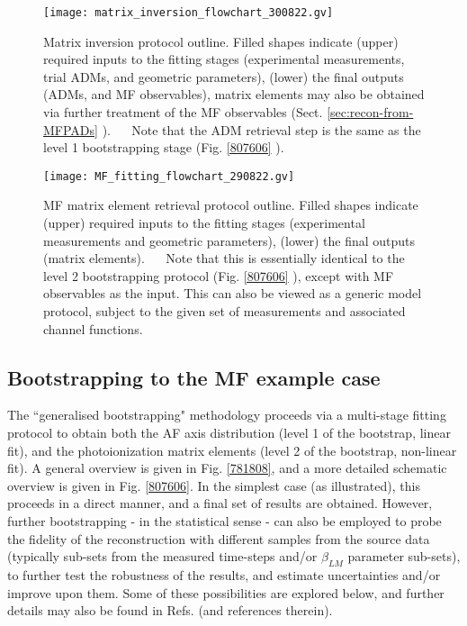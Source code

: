 \documentclass[10pt]{article}
\begin{document}
\begin{figure}[]
\begin{center}
\texttt{[image: matrix\_inversion\_flowchart\_300822.gv]}
\caption{Matrix inversion protocol outline. Filled shapes indicate (upper) required inputs to the fitting stages (experimental measurements, trial ADMs, and geometric parameters), (lower) the final outputs (ADMs, and MF observables), matrix elements may also be obtained via further treatment of the MF observables (Sect. \ref{sec:recon-from-MFPADs} ).    Note that the ADM retrieval step is the same as the level 1 bootstrapping stage (Fig. \ref{807606} ).\label{731792}}
\end{center}
\end{figure}


\begin{figure}[]
\begin{center}
\texttt{[image: MF\_fitting\_flowchart\_290822.gv]}
\caption{MF matrix element retrieval protocol outline. Filled shapes indicate (upper) required inputs to the fitting stages (experimental measurements and geometric parameters), (lower) the final outputs (matrix elements).    Note that this is essentially identical to the level 2 bootstrapping protocol (Fig. \ref{807606} ), except with MF observables as the input. This can also be viewed as a generic model protocol, subject to the given set of measurements and associated channel functions.\label{671760}}
\end{center}
\end{figure}

\subsection{Bootstrapping to the MF example case\label{sec:bootstrapping}}


The ``generalised bootstrapping" methodology proceeds via a multi-stage fitting protocol to obtain both the AF axis distribution (level 1 of the bootstrap, linear fit), and the photoionization matrix elements (level 2 of the bootstrap, non-linear fit). A general overview is given in Fig. \ref{781808}, and a more detailed schematic overview is given in Fig. \ref{807606}. In the simplest case (as illustrated), this proceeds in a direct manner, and a final set of results are obtained. However, further bootstrapping - in the statistical sense - can also be employed to probe the fidelity of the reconstruction with different samples from the source data (typically sub-sets from the measured time-steps and/or $\beta_{LM}$ parameter sub-sets), to further test the robustness of the results, and estimate uncertainties and/or improve upon them. Some of these possibilities are explored below, and further details may also be found in Refs. \cite{hockett2018QMP1,hockett2018QMP2,marceau2017MolecularFrameReconstruction} (and references therein).
\end{document}
